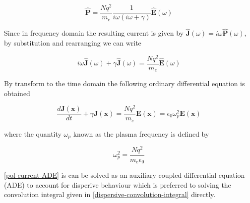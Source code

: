 \begin{equation}
  \mathbf{\hat{P}} = \frac{N q^2}{m_e} \frac{1}{i \omega ( i \omega + \gamma ) } \mathbf{\hat{E}}(\omega)
\end{equation}

Since in frequency domain the resulting current is given by $\mathbf{\hat{J}}(\omega) = i \omega \mathbf{\hat{P}}(\omega)$, by substitution and rearranging we can write

\begin{equation}
  i \omega \mathbf{\hat{J}}(\omega) + \gamma \mathbf{\hat{J}}(\omega) = \frac{N q^2}{m_e} \mathbf{\hat{E}}(\omega)
\end{equation}

By transform to the time domain the following ordinary differential equation is obtained

\begin{equation}
  \frac{d \mathbf{J}(\mathbf{x})}{dt} + \gamma \mathbf{J}(\mathbf{x}) = \frac{N q^2}{m_e} \mathbf{E}(\mathbf{x}) = \epsilon_0 \omega_p^2 \mathbf{E}(\mathbf{x})
  \label{pol-current-ADE}
\end{equation}

where the quantity $\omega_p$ known as the plasma frequency is defined by

\begin{equation}
  \omega_p ^2 = \frac{N q^2}{m_e \epsilon_0}
\end{equation}

\eqref{pol-current-ADE} is can be solved as an auxiliary coupled differential equation (ADE) to account for disperive behaviour \cite{taflove2005computational,niegemann2007higher,ji2007high} which is preferred to solving the convolution integral given in \eqref{dispersive-convolution-integral} directly.


